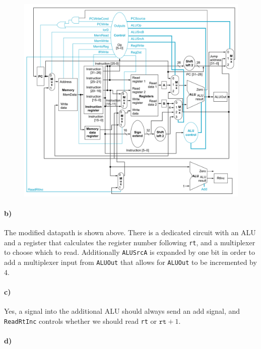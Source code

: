 \documentclass[12pt]{article}
\begin{document}
\begin{figure}[!ht]
    \begin{center}
        \includegraphics[width=4.8in]{problem5b.png}
    \end{center}
\end{figure}

\paragraph{b)}

The modified datapath is shown above. There is a dedicated circuit with an ALU and a register that calculates the register number following \texttt{rt}, and a
multiplexer to choose which to read. Additionally \texttt{ALUSrcA} is expanded by one bit in order to add a multiplexer input from \texttt{ALUOut} that
allows for \texttt{ALUOut} to be incremented by 4.

\paragraph{c)}

Yes, a signal into the additional ALU should always send an add signal, and \texttt{ReadRtInc} controls whether we should read \texttt{rt} or \(\texttt{rt}+1\).

\paragraph{d)}
\end{document}
